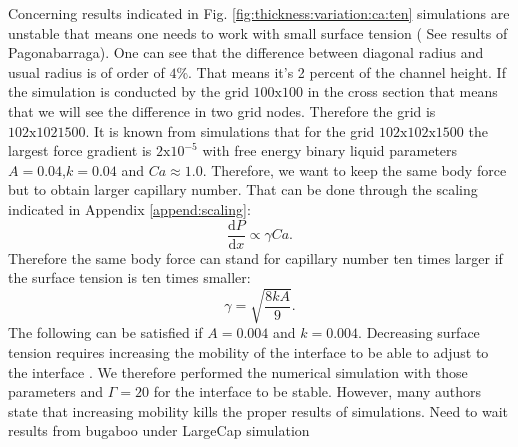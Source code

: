 \documentclass{article}
\begin{document}
Concerning results indicated in Fig.
\ref{fig:thickness:variation:ca:ten} simulations are unstable that means one needs to work with
small surface tension ({\color{red} See results of Pagonabarraga}). One can see that the difference
between diagonal radius and
usual radius is of order of $4\%$. That means it's 2 percent of the channel height. If the
simulation is conducted by the grid $100\mathrm{x}100$ in the cross section that means that we will
see the difference in two grid nodes. Therefore the grid is $102\mathrm{x}102\mathrm{1500}$. It is
known from simulations that for the grid $102\mathrm{x}102\mathrm{x}1500$ the largest force gradient
is $2\mathrm{x}10^{-5}$ with free energy binary liquid parameters $A=0.04$,$k=0.04$ and $Ca\approx
1.0$. Therefore, we want to keep the same body force but to obtain larger capillary number. That
can be done through the scaling indicated in Appendix \ref{append:scaling}:
\begin{equation}
\frac{\mathrm{d}P}{\mathrm{d}x}\propto \gamma Ca .
\end{equation}
Therefore the same body force can stand for capillary number ten times larger if the surface
tension is ten times smaller:
\begin{equation}
\gamma=\sqrt{\frac{8 k A}{9}}.
\end{equation}
The following can be satisfied if $A=0.004$ and $k=0.004$. Decreasing surface tension requires
increasing the mobility of the interface to be able to adjust to the interface
\cite{pagonabarraga-parameters}. We therefore performed the numerical simulation with those
parameters and $\Gamma=20$ for the interface to be stable. 
{\color{red} However, many authors state that increasing mobility kills
the
proper results of simulations}.
{\color{red} Need to wait results from bugaboo under LargeCap simulation}
\end{document}
